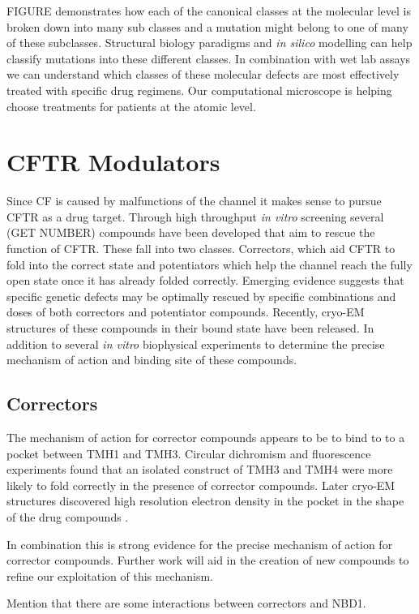 FIGURE demonstrates how each of the canonical classes at the molecular level is broken down into many sub classes and a mutation might belong to one of many of these subclasses. Structural biology paradigms and \textit{in silico} modelling can help classify mutations into these different classes. In combination with wet lab assays we can understand which classes of these molecular defects are most effectively treated with specific drug regimens. Our computational microscope is helping choose treatments for patients at the atomic level. 

\section{CFTR Modulators}
Since CF is caused by malfunctions of the channel it makes sense to pursue CFTR as a drug target. Through high throughput \textit{in vitro} screening several (GET NUMBER) compounds have been developed that aim to rescue the function of CFTR. These fall into two classes. Correctors, which aid CFTR to fold into the correct state and potentiators which help the channel reach the fully open state once it has already folded correctly. Emerging evidence suggests that specific genetic defects may be optimally rescued by specific combinations and doses of both correctors and potentiator compounds. Recently, cryo-EM structures of these compounds in their bound state have been released. In addition to several \textit {in vitro} biophysical experiments to determine the precise mechanism of action and binding site of these compounds.

\subsection{Correctors}
The mechanism of action for corrector compounds appears to be to bind to to a pocket between TMH1 and TMH3. Circular dichromism and fluorescence experiments found that an isolated construct of TMH3 and TMH4 were more likely to fold correctly in the presence of corrector compounds. Later cryo-EM structures discovered high resolution electron density in the pocket in the shape of the drug compounds \cite{fiedorczuk2022}. 

In combination this is strong evidence for the precise mechanism of action for corrector compounds. Further work will aid in the creation of new compounds to refine our exploitation of this mechanism.

Mention that there are some interactions between correctors and NBD1.

